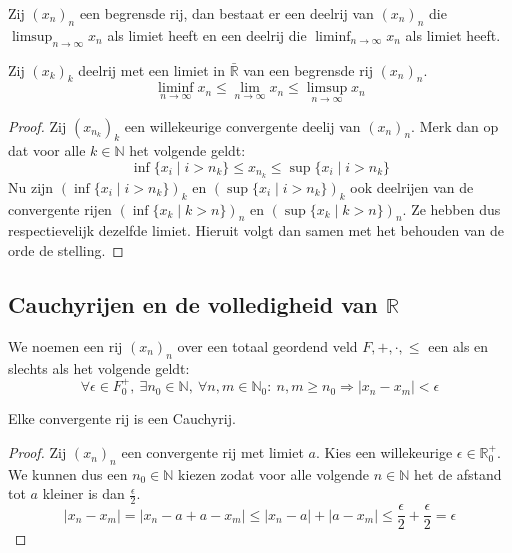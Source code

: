 \documentclass[main.tex]{subfiles}
\begin{document}
\begin{bpr}
  Zij $(x_{n})_{n}$ een begrensde rij, dan bestaat er een deelrij van $(x_{n})_{n}$ die $\limsup_{n\rightarrow \infty} x_{n}$ als limiet heeft en een deelrij die $\liminf_{n\rightarrow \infty} x_{n}$ als limiet heeft.
\end{bpr}

\begin{bpr}
  Zij $(x_{k})_{k}$ deelrij met een limiet in $\bar{\mathbb{R}}$ van een begrensde rij $(x_{n})_{n}$.
  \[ \liminf_{n\rightarrow \infty} x_{n} \le \lim_{n\rightarrow \infty} x_{n} \le \limsup_{n\rightarrow \infty} x_{n} \]

  \begin{proof}
    Zij $(x_{n_{k}})_{k}$ een willekeurige convergente deelij van $(x_{n})_{n}$.
    Merk dan op dat voor alle $k\in \mathbb{N}$ het volgende geldt:
    \[ \inf\{x_{i}\mid i>n_{k}\} \le x_{n_{k}} \le \sup\{x_{i}\mid i>n_{k}\}\]
    Nu zijn $(\inf\{x_{i}\mid i>n_{k}\})_{k}$ en $(\sup\{x_{i}\mid i>n_{k}\})_{k}$ ook deelrijen van de convergente rijen $(\inf\{x_{k}\mid k>n\})_{n}$ en $(\sup\{x_{k}\mid k>n\})_{n}$.
    Ze hebben dus respectievelijk dezelfde limiet.
    Hieruit volgt dan samen met het behouden van de orde de stelling.
  \end{proof}
\end{bpr}

\subsection{Cauchyrijen en de volledigheid van $\mathbb{R}$}
\label{sec:cauchyrijen-en-de}

\begin{de}
  We noemen een rij $(x_{n})_{n}$ over een totaal geordend veld $F,+,\cdot,\le$ een  als en slechts als het volgende geldt:
  \[ \forall \epsilon \in F_{0}^{+},\ \exists n_{0}\in \mathbb{N},\ \forall n,m \in \mathbb{N}_{0}:\ n,m \ge n_{0} \Rightarrow |x_{n}-x_{m}| < \epsilon \]
\end{de}

\begin{bpr}
  \label{pr:convergent-dan-cauchy}
  Elke convergente rij is een Cauchyrij.
  
  \begin{proof}
    Zij $(x_{n})_{n}$ een convergente rij met limiet $a$.
    Kies een willekeurige $\epsilon\in \mathbb{R}_{0}^{+}$.
    We kunnen dus een $n_{0}\in \mathbb{N}$ kiezen zodat voor alle volgende $n\in\mathbb{N}$ het de afstand tot $a$ kleiner is dan $\frac{\epsilon}{2}$.
    \[ |x_{n}-x_{m}| = |x_{n}-a+a-x_{m}| \le |x_{n}-a|+|a-x_{m}| \le \frac{\epsilon}{2}+\frac{\epsilon}{2}=\epsilon \]
  \end{proof}
\end{bpr}
\end{document}

